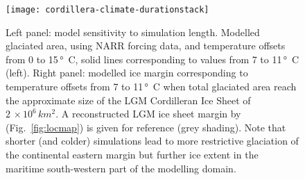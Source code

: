 \begin{figure}[t]
	\vspace*{2mm}
	\begin{center}
		\texttt{[image: cordillera-climate-durationstack]}
	\end{center}
	\caption{Left panel: model sensitivity to simulation length. Modelled glaciated area, using NARR forcing data, and temperature offsets from 0 to 15\,\unit{\degree C}, solid lines corresponding to values from 7 to 11\,\unit{\degree C} (left). Right panel: modelled ice margin corresponding to temperature offsets from 7 to 11\,\unit{\degree C} when total glaciated area reach the approximate size of the LGM Cordilleran Ice Sheet of $2\,\times10^6\,\unit{km^2}$. A reconstructed LGM ice sheet margin by \citet{dyke-2004} (Fig.~\ref{fig:locmap}) is given for reference (grey shading). Note that shorter (and colder) simulations lead to more restrictive glaciation of the continental eastern margin but further ice extent in the maritime south-western part of the modelling domain.}
	\label{fig:durationstack}
\end{figure}
